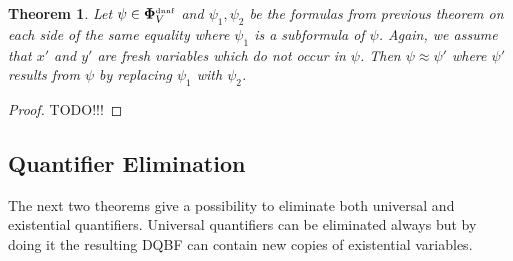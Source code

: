 \documentclass[
  digital, %
  twoside, %
  table,   %
  nolof,     %
  nolot,     %
]{fithesis3}
\newtheorem{theorem}{Theorem}[chapter] %
\theoremstyle{definition}
\theoremstyle{remark}
\newcommand{\DQBF}[1]{\mathbf{\Phi}_{#1}^{\text{\tiny dnnf}}}
\begin{document}
\begin{theorem}
  Let $\psi \in \DQBF{V}$ and $\psi_1, \psi_2$ be the formulas from previous theorem on each side of the same equality where $\psi_1$ is a subformula of $\psi$. Again, we assume that $x'$ and $y'$ are fresh variables which do not occur in $\psi$. Then $\psi \approx \psi'$ where $\psi'$ results from $\psi$ by replacing $\psi_1$ with $\psi_2$.
\end{theorem}
\begin{proof}
  TODO!!!
\end{proof}

\subsection{Quantifier Elimination}

The next two theorems give a possibility to eliminate both universal and existential quantifiers. Universal quantifiers can be eliminated always but by doing it the resulting DQBF can contain new copies of existential variables.
\end{document}
